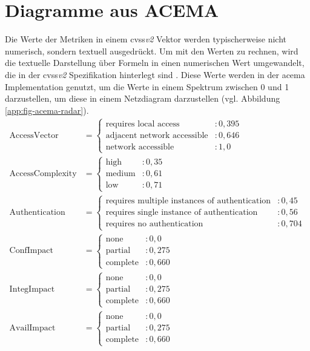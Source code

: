 \chapter{Diagramme aus ACEMA}
\label{app:acema-diagrams}
Die Werte der Metriken in einem \gls{cvss}\textit{v2} Vektor werden typischerweise nicht numerisch, sondern textuell ausgedrückt. Um mit den Werten zu rechnen, wird die textuelle Darstellung über Formeln in einen numerischen Wert umgewandelt, die in der \gls{cvss}\textit{v2} Spezifikation hinterlegt sind \autocite{CVSSV2Complete}. Diese Werte werden in der \gls{acema} Implementation genutzt, um die Werte in einem Spektrum zwischen 0 und 1 darzustellen, um diese in einem Netzdiagram darzustellen (vgl. Abbildung \ref{app:fig-acema-radar}).
\[
\begin{aligned}
\text{AccessVector} & = 
\begin{cases} 
    \text{requires local access} & : 0{,}395 \\
    \text{adjacent network accessible} & : 0{,}646 \\
    \text{network accessible} & : 1{,}0
\end{cases} \\[10pt]
\text{AccessComplexity} & = 
\begin{cases} 
    \text{high} & : 0{,}35 \\
    \text{medium} & : 0{,}61 \\
    \text{low} & : 0{,}71
\end{cases} \\[10pt]
\text{Authentication} & = 
\begin{cases} 
    \text{requires multiple instances of authentication} & : 0{,}45 \\
    \text{requires single instance of authentication} & : 0{,}56 \\
    \text{requires no authentication} & : 0{,}704
\end{cases} \\[10pt]
\text{ConfImpact} & = 
\begin{cases} 
    \text{none} & : 0{,}0 \\
    \text{partial} & : 0{,}275 \\
    \text{complete} & : 0{,}660
\end{cases} \\[10pt]
\text{IntegImpact} & = 
\begin{cases} 
    \text{none} & : 0{,}0 \\
    \text{partial} & : 0{,}275 \\
    \text{complete} & : 0{,}660
\end{cases} \\[10pt]
\text{AvailImpact} & = 
\begin{cases} 
    \text{none} & : 0{,}0 \\
    \text{partial} & : 0{,}275 \\
    \text{complete} & : 0{,}660
\end{cases}
\end{aligned}
\]


